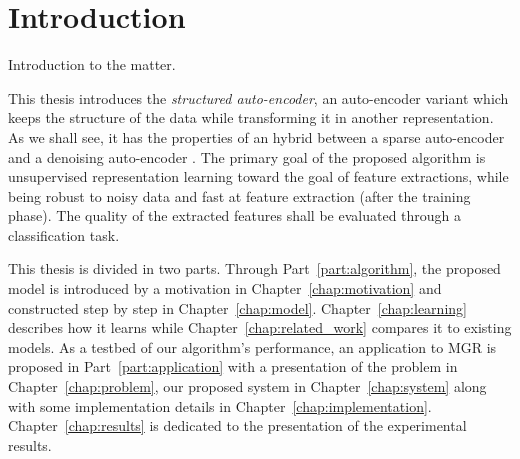 \documentclass[a4paper,12pt,twoside]{report}
\newcommand{\partref}[1]{Part~\ref{part:#1}}
\newcommand{\chapref}[1]{Chapter~\ref{chap:#1}}
\begin{document}
\printglossaries




\chapter*{Introduction}

{\color{red} Introduction to the matter.}

This thesis introduces the \textit{structured auto-encoder}, an auto-encoder variant which keeps the structure of the data while transforming it in another representation. As we shall see, it has the properties of an hybrid between a sparse auto-encoder \cite{lecun2006sparseAutoencoders, ranzato2007stackedSparseAutoencoders} and a denoising auto-encoder \cite{bengio2008denoisingAutoencoders}. The primary goal of the proposed algorithm is unsupervised representation learning toward the goal of feature extractions, while being robust to noisy data and fast at feature extraction (after the training phase). The quality of the extracted features shall be evaluated through a classification task.

This thesis is divided in two parts. Through \partref{algorithm}, the proposed model is introduced by a motivation in \chapref{motivation} and constructed step by step in \chapref{model}. \chapref{learning} describes how it learns while \chapref{related_work} compares it to existing models. As a testbed of our algorithm's performance, an application to \gls{MGR} is proposed in \partref{application} with a presentation of the problem in \chapref{problem}, our proposed system in \chapref{system} along with some implementation details in \chapref{implementation}. \chapref{results} is dedicated to the presentation of the experimental results.
\end{document}
